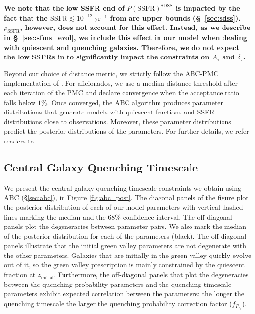 \documentclass[iop,apj,tighten,twocolappendix,numberedappendix]{emulateapj}
\newcommand{\zinit}{z_\mathrm{initial}}
\begin{document}
{\bf \color{dred}
We note that the low SSFR end of $P(\mathrm{SSFR})^\mathrm{SDSS}$ 
is impacted by the fact that the 
$\mathrm{SSFR} \lesssim 10^{-12}\;\mathrm{yr}^{-1}$ from 
\cite{Brinchmann:2004aa} are upper bounds (\S~\ref{sec:sdss}). 
$\rho_\mathrm{SSFR}$, however, does not account for this effect. 
Instead, as we describe in \S~\ref{sec:sfms_evol}, 
we include this effect in our model when dealing with 
quiescent and quenching galaxies. Therefore, we do not expect
the low SSFRs in \cite{Brinchmann:2004aa} to significantly impact
the constraints on $A_\tau$ and $\delta_\tau$. 
}

Beyond our choice of distance metric, we strictly follow the ABC-PMC 
implementation of \cite{Hahn:2016aa}. For aficionados, we use a median 
distance threshold after each iteration of the PMC and declare 
convergence when the acceptance ratio falls below $1\%$. Once converged, 
the ABC algorithm produces parameter distributions that generate models 
with quiescent fractions and SSFR distributions close to observations. 
Moreover, these parameter distributions predict the posterior distributions 
of the parameters. For further details, we refer readers to \cite{Hahn:2016aa}.

\subsection{Central Galaxy Quenching Timescale} \label{sec:results}
We present the central galaxy quenching timescale constraints 
we obtain using ABC (\S \ref{sec:abc}), in Figure 
\ref{fig:abc_post}. The diagonal panels of the figure plot 
the posterior distribution of each of our model parameters 
with vertical dashed lines marking the median and the $68\%$ 
confidence interval. The off-diagonal panels plot the 
degeneracies between parameter pairs. We also mark the median 
of the posterior distribution for each of the parameters (black). 
The off-diagonal panels illustrate that the initial green valley 
parameters are not degenerate with the other parameters. 
Galaxies that are initially in the green valley quickly 
evolve out of it, so the green valley prescription is mainly 
constrained by the quiescent fraction at $\zinit$. Furthermore, 
the off-diagonal panels that plot the degeneracies between 
the quenching probability parameters and the quenching timescale 
parameters exhibit expected correlation between the parameters: 
the longer the quenching timescale the larger the quenching 
probability correction factor ($f_{P_Q}$). 
\end{document}
